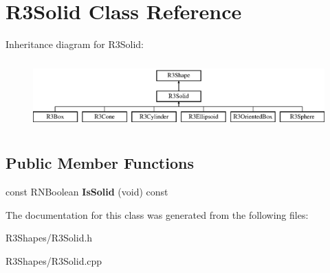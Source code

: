 \hypertarget{class_r3_solid}{}\section{R3\+Solid Class Reference}
\label{class_r3_solid}
Inheritance diagram for R3\+Solid\+:\begin{figure}[H]
\begin{center}
\leavevmode
\includegraphics[height=2.666667cm]{class_r3_solid}
\end{center}
\end{figure}
\subsection*{Public Member Functions}
\begin{DoxyCompactItemize}
\item 
const R\+N\+Boolean {\bfseries Is\+Solid} (void) const \hypertarget{class_r3_solid_a19553484deb7afb7c4aed74cf933676d}{}\label{class_r3_solid_a19553484deb7afb7c4aed74cf933676d}

\end{DoxyCompactItemize}


The documentation for this class was generated from the following files\+:\begin{DoxyCompactItemize}
\item 
R3\+Shapes/R3\+Solid.\+h\item 
R3\+Shapes/R3\+Solid.\+cpp\end{DoxyCompactItemize}
